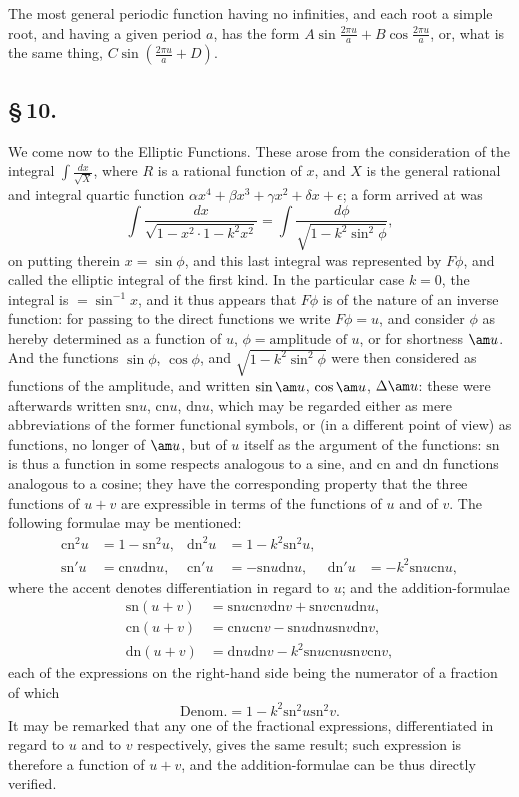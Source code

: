 \documentclass[11pt,a4paper]{book}
\providecommand{\sn}{\mathrm{sn}}
\providecommand{\cn}{\mathrm{cn}}
\providecommand{\dn}{\mathrm{dn}}
\begin{document}
The most general periodic function having no infinities, and each root a simple root, and having a given period $a$, has the form $A\sin\frac{2\pi u}{a} + B\cos\frac{2\pi u}{a}$, or, what is the same thing, $C\sin\left(\frac{2\pi u}{a} + D\right)$.

\subsection*{\S\,10.}

We come now to the Elliptic Functions. These arose from the consideration of the integral $\int\frac{dx}{\sqrt{X}}$, where $R$ is a rational function of $x$, and $X$ is the general rational and integral quartic function $\alpha x^{4} + \beta x^{3} + \gamma x^{2} + \delta x + \epsilon$; a form arrived at was
\[
\int\frac{dx}{\sqrt{1 - x^{2} \cdot 1 - k^{2}x^{2}}} = \int\frac{d\phi}{\sqrt{1 - k^{2}\sin^{2}\phi}},
\]
on putting therein $x = \sin\phi$, and this last integral was represented by $F\phi$, and called the elliptic integral of the first kind. In the particular case $k = 0$, the integral is $= \sin^{-1}x$, and it thus appears that $F\phi$ is of the nature of an inverse function: for passing to the direct functions we write $F\phi = u$, and consider $\phi$ as hereby determined as a function of $u$, $\phi = \text{amplitude of } u$, or for shortness $\am u$. And the functions $\sin\phi$, $\cos\phi$, and $\sqrt{1 - k^{2}\sin^{2}\phi}$ were then considered as functions of the amplitude, and written $\sin\am u$, $\cos\am u$, $\Delta\am u$: these were afterwards written $\sn u$, $\cn u$, $\dn u$, which may be regarded either as mere abbreviations of the former functional symbols, or (in a different point of view) as functions, no longer of $\am u$, but of $u$ itself as the argument of the functions: $\sn$ is thus a function in some respects analogous to a sine, and $\cn$ and $\dn$ functions analogous to a cosine; they have the corresponding property that the three functions of $u + v$ are expressible in terms of the functions of $u$ and of $v$. The following formulae may be mentioned:
\begin{align*}
\cn^{2}u &= 1 - \sn^{2}u, & \dn^{2}u &= 1 - k^{2}\sn^{2}u, \\
\sn' u &= \cn u \dn u, & \cn' u &= -\sn u \dn u, & \dn' u &= -k^{2}\sn u \cn u,
\end{align*}
where the accent denotes differentiation in regard to $u$; and the addition-formulae
\begin{align*}
\sn(u + v) &= \sn u \cn v \dn v + \sn v \cn u \dn u, \\
\cn(u + v) &= \cn u \cn v - \sn u \dn u \sn v \dn v, \\
\dn(u + v) &= \dn u \dn v - k^{2}\sn u \cn u \sn v \cn v,
\end{align*}
each of the expressions on the right-hand side being the numerator of a fraction of which
\[
\text{Denom.} = 1 - k^{2}\sn^{2}u \sn^{2}v.
\]
It may be remarked that any one of the fractional expressions, differentiated in regard to $u$ and to $v$ respectively, gives the same result; such expression is therefore a function of $u + v$, and the addition-formulae can be thus directly verified.
\end{document}
